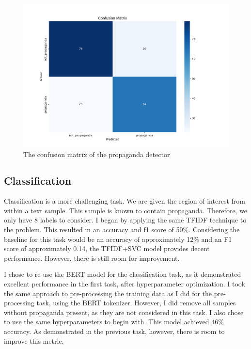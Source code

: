 \documentclass[twocolumn]{article}
\begin{document}
\begin{figure}
    \centering 
    \includegraphics*[scale=0.25]{../assets/propaganda-detection-confusion-matrix.png}
    \caption{The confusion matrix of the propaganda detector}
    \label{fig:detection-cm}
\end{figure}

\subsection{Classification}

Classification is a more challenging task. We are given the region of interest from within a text sample. This sample is known to contain propaganda. Therefore, we only have 8 labels to consider. I began by applying the same TFIDF technique to the problem. This resulted in an accuracy and f1 score of 50\%. Considering the baseline for this task would be an accuracy of approximately 12\% and an F1 score of approximately 0.14, the TFIDF+SVC model provides decent performance. However, there is still room for improvement. 

I chose to re-use the BERT model for the classification task, as it demonstrated excellent performance in the first task, after hyperparameter optimization. I took the same approach to pre-processing the training data as I did for the pre-processing task, using the BERT tokenizer. However, I did remove all samples without propaganda present, as they are not considered in this task. I also chose to use the same hyperparameters to begin with. This model achieved 46\% accuracy. As demonstrated in the previous task, however, there is room to improve this metric. 
\end{document}
